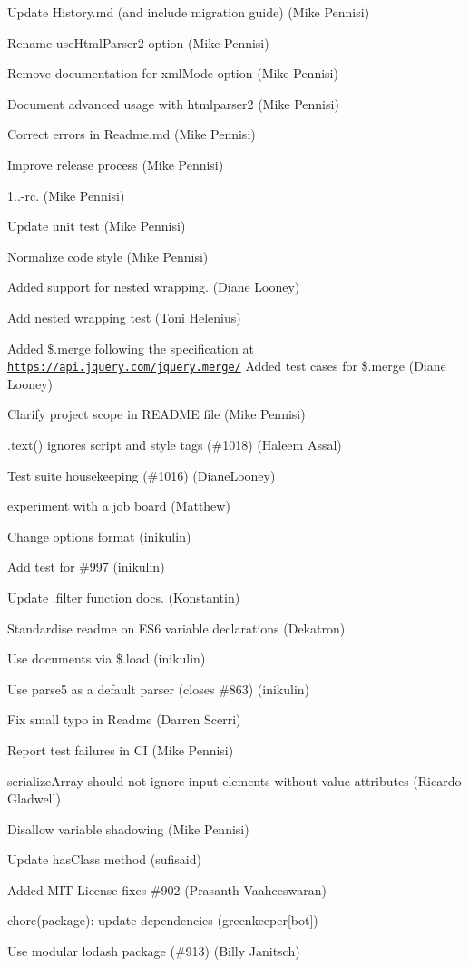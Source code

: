 \begin{DoxyItemize}
\item Update History.\+md (and include migration guide) (Mike Pennisi)
\item Rename {\ttfamily use\+Html\+Parser2} option (Mike Pennisi)
\item Remove documentation for {\ttfamily xml\+Mode} option (Mike Pennisi)
\item Document advanced usage with htmlparser2 (Mike Pennisi)
\item Correct errors in Readme.\+md (Mike Pennisi)
\item Improve release process (Mike Pennisi)
\item 1..-\/rc. (Mike Pennisi)
\item Update unit test (Mike Pennisi)
\item Normalize code style (Mike Pennisi)
\item Added support for nested wrapping. (Diane Looney)
\item Add nested wrapping test (Toni Helenius)
\item Added \$.merge following the specification at \href{https://api.jquery.com/jquery.merge/}{\tt https\+://api.\+jquery.\+com/jquery.\+merge/} Added test cases for \$.merge (Diane Looney)
\item Clarify project scope in R\+E\+A\+D\+ME file (Mike Pennisi)
\item .text() ignores script and style tags (\#1018) (Haleem Assal)
\item Test suite housekeeping (\#1016) (Diane\+Looney)
\item experiment with a job board (Matthew)
\item Change options format (inikulin)
\item Add test for \#997 (inikulin)
\item Update .filter function docs. (Konstantin)
\item Standardise readme on E\+S6 variable declarations (Dekatron)
\item Use documents via \$.load (inikulin)
\item Use parse5 as a default parser (closes \#863) (inikulin)
\item Fix small typo in Readme (Darren Scerri)
\item Report test failures in CI (Mike Pennisi)
\item serialize\+Array should not ignore input elements without value attributes (Ricardo Gladwell)
\item Disallow variable shadowing (Mike Pennisi)
\item Update has\+Class method (sufisaid)
\item Added M\+IT License fixes \#902 (Prasanth Vaaheeswaran)
\item chore(package)\+: update dependencies (greenkeeper\mbox{[}bot\mbox{]})
\item Use modular lodash package (\#913) (Billy Janitsch)
\end{DoxyItemize}

